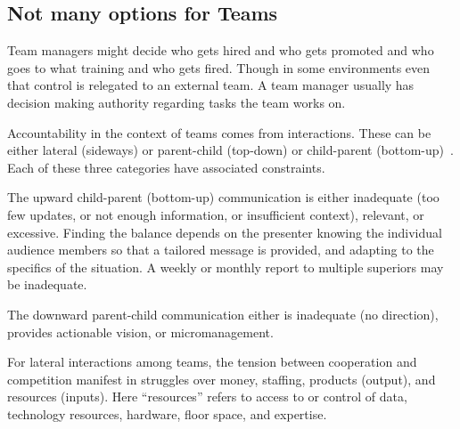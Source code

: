 \subsection*{Not many options for Teams}

Team managers might decide who gets hired and who gets promoted and who goes to what training and who gets fired. Though in some environments even that control is relegated to an external team. A team manager usually has decision making authority regarding tasks the team works on. 

Accountability in the context of teams comes from interactions. These can be either lateral (sideways) or parent-child (top-down) or child-parent (bottom-up)~\cite{2014_Jorgensen}. Each of these three categories have associated constraints.

The upward child-parent (bottom-up) communication is either inadequate (too few updates, or not enough information, or insufficient context), relevant, or excessive. Finding the balance depends on the presenter knowing the individual audience members so that a tailored message is provided, and adapting to the specifics of the situation. A weekly or monthly report to multiple superiors may be inadequate. 

The downward parent-child communication either is inadequate (no direction), provides actionable vision, or micromanagement. 

For lateral interactions among teams, the tension between cooperation and competition manifest in struggles over money, staffing, products (output), and resources (inputs). Here ``resources''  refers to access to or control of data, technology resources, hardware, floor space, and expertise. 



